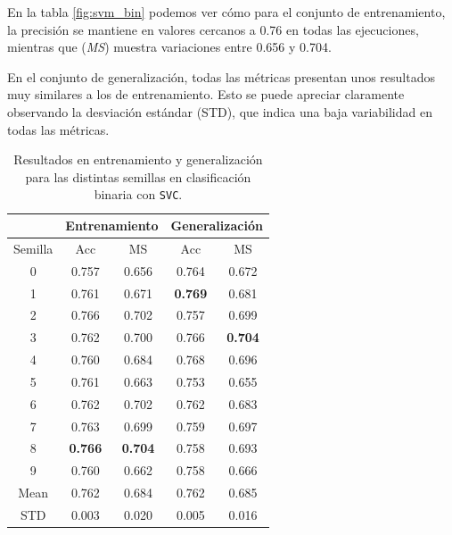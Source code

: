 En la tabla \ref{fig:svm_bin} podemos ver cómo para el conjunto de entrenamiento, la precisión se mantiene en valores cercanos a 0.76 en todas las ejecuciones, mientras que (\textit{MS}) muestra variaciones entre 0.656 y 0.704.

\vspace{1em}

En el conjunto de generalización, todas las métricas presentan unos resultados muy similares a los de entrenamiento. Esto se puede apreciar claramente observando la desviación estándar (STD), que indica una baja variabilidad en todas las métricas.

\begin{table}[H]
	\centering
	\begin{tabular}{ |c|c|c|c|c| }
		\hline
		\rowcolor{LightCyan}
		 & \multicolumn{2}{c|}{Entrenamiento} & \multicolumn{2}{c|}{Generalización} \\
		\hline
		\rowcolor{LightCyan}
		 Semilla & Acc & MS & Acc & MS \\
		\hline
		0    & 0.757          & 0.656          & 0.764          & 0.672          \\
		1    & 0.761          & 0.671          & \textbf{0.769} & 0.681          \\
		2    & 0.766          & 0.702          & 0.757          & 0.699          \\
		3    & 0.762          & 0.700          & 0.766          & \textbf{0.704} \\
		4    & 0.760          & 0.684          & 0.768          & 0.696          \\
		5    & 0.761          & 0.663          & 0.753          & 0.655          \\
		6    & 0.762          & 0.702          & 0.762          & 0.683          \\
		7    & 0.763          & 0.699          & 0.759          & 0.697          \\
		8    & \textbf{0.766} & \textbf{0.704} & 0.758          & 0.693          \\
		9    & 0.760          & 0.662          & 0.758          & 0.666          \\
		Mean & 0.762          & 0.684          & 0.762          & 0.685          \\
		STD  & 0.003          & 0.020          & 0.005          & 0.016          \\
		\hline
	\end{tabular}
	\caption{Resultados en entrenamiento y generalización para las distintas semillas en clasificación binaria con \texttt{SVC}.}
	\label{tabla:svm_bin}
\end{table}

